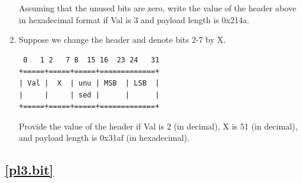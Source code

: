 \documentclass[12pt]{book}
\begin{document}
\begin{enumerate}[label=Activity \arabic*:]
Assuming that the unused bits are zero, write the value of the header above in hexadecimal format if Val is 3 and payload length is 0x214a.

\item Suppose we change the header and denote bits 2-7 by X.
\begin{verbatim}
 0   1 2   7 8  15 16  23 24   31
+=====+=====+=====+=============+
| Val |  X  | unu | MSB  | LSB  |
|     |     | sed |      |      |
+=====+=====+=====+=============+ 
\end{verbatim}

Provide the value of the header if Val is 2 (in decimal), X is 51 (in decimal), and payload length is 0x31af (in hexadecimal).
\end{enumerate}


\subsection{\ref{pl3.bit}}
\end{document}
